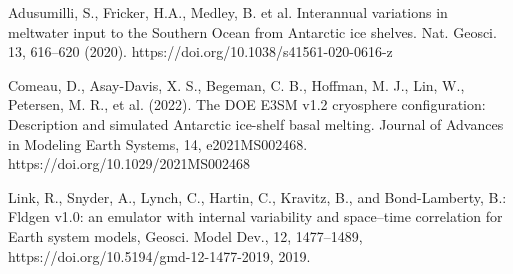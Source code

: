 \begin{thebibliography}{1}

Adusumilli, S., Fricker, H.A., Medley, B. et al. Interannual variations in meltwater input to the Southern Ocean from Antarctic ice shelves. Nat. Geosci. 13, 616–620 (2020). https://doi.org/10.1038/s41561-020-0616-z

Comeau, D., Asay-Davis, X. S., Begeman, C. B., Hoffman, M. J., Lin, W., Petersen, M. R., et al. (2022). The DOE E3SM v1.2 cryosphere configuration: Description and simulated Antarctic ice-shelf basal melting. Journal of Advances in Modeling Earth Systems, 14, e2021MS002468. https://doi.org/10.1029/2021MS002468

Link, R., Snyder, A., Lynch, C., Hartin, C., Kravitz, B., and Bond-Lamberty, B.: Fldgen v1.0: an emulator with internal variability and space–time correlation for Earth system models, Geosci. Model Dev., 12, 1477–1489, https://doi.org/10.5194/gmd-12-1477-2019, 2019.

\end{thebibliography}